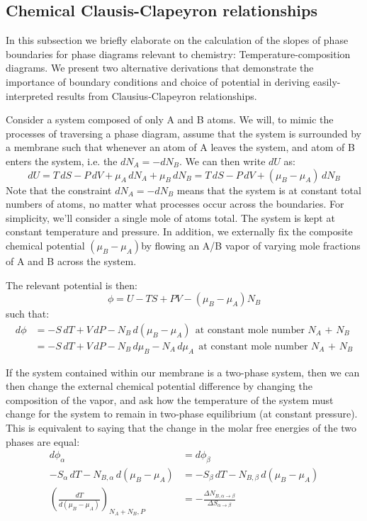 \documentclass[12pt]{article}
\begin{document}
\subsection{Chemical Clausis-Clapeyron relationships}
In this subsection we briefly elaborate on the calculation of the slopes of phase boundaries for phase diagrams relevant to chemistry: Temperature-composition diagrams. We present two alternative derivations that demonstrate the importance of boundary conditions and choice of potential in deriving easily-interpreted results from Clausius-Clapeyron relationships.

Consider a system composed of only A and B atoms. We will, to mimic the processes of traversing a phase diagram, assume that the system is surrounded by a membrane such that whenever an atom of A leaves the system, and atom of B enters the system, i.e. the $dN_A=-dN_B$. We can then write $dU$ as:
\begin{equation} 
dU=T\, dS - P\, dV + \mu_A \, dN_A + \mu_B \, dN_B =T\, dS - P\, dV + (\mu_B-\mu_A) \, dN_B
\end{equation} 
Note that the constraint $dN_A=-dN_B$ means that the system is at constant total numbers of atoms, no matter what processes occur across the boundaries. For simplicity, we'll consider a single mole of atoms total. The system is kept at constant temperature and pressure. In addition, we externally fix the composite chemical potential $(\mu_B-\mu_A)$by flowing an A/B vapor of varying mole fractions of A and B across the system. 

The relevant potential is then:
\begin{equation}
\phi = U-TS+PV-(\mu_B-\mu_A)N_B
\end{equation}
such that:
\begin{equation}\begin{aligned}
d\phi &= -S\,dT+V\,dP-N_B\, d(\mu_B-\mu_A) \ \ \text{at constant mole number $N_A$ + $N_B$} \\
&= -S\,dT+V\,dP-N_B\, d\mu_B-N_A\, d\mu_A \ \ \text{at constant mole number $N_A$ + $N_B$}
\end{aligned}\end{equation}

If the system contained within our membrane is a two-phase system, then we can then change the external chemical potential difference by changing the composition of the vapor, and ask how the temperature of the system must change for the system to remain in two-phase equilibrium (at constant pressure). This is equivalent to saying that the change in the molar free energies of the two phases are equal:
\begin{align}
d\phi_\alpha &= d\phi_\beta \\
-S_\alpha\,dT -N_{B,\alpha}\,d(\mu_B-\mu_A) &= -S_\beta\,dT -N_{B,\beta}\, d(\mu_B-\mu_A)\\
\left(\frac{dT}{d(\mu_B-\mu_A)}\right)_{N_A+N_B,P}&=-\frac{\Delta N_{B,\alpha \to \beta}}{\Delta S_{\alpha \to \beta}}\label{genClap}
\end{align}
\end{document}
